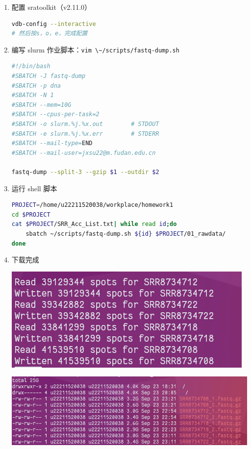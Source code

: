 \documentclass[
  a4paper,
]{article}
\newcommand{\passthrough}[1]{#1}
\begin{document}
\begin{enumerate}
\def\labelenumi{\arabic{enumi}.}
\item
  配置 sratoolkit（v2.11.0）

\begin{lstlisting}[language=bash]
vdb-config --interactive
# 然后按s，o，e，完成配置
\end{lstlisting}
\item
  编写 slurm
  作业脚本：\passthrough{\lstinline!vim \~/scripts/fastq-dump.sh!}

\begin{lstlisting}[language=bash]
#!/bin/bash
#SBATCH -J fastq-dump
#SBATCH -p dna
#SBATCH -N 1
#SBATCH --mem=10G
#SBATCH --cpus-per-task=2
#SBATCH -o slurm.%j.%x.out        # STDOUT
#SBATCH -e slurm.%j.%x.err        # STDERR
#SBATCH --mail-type=END
#SBATCH --mail-user=jxsu22@m.fudan.edu.cn

fastq-dump --split-3 --gzip $1 --outdir $2
\end{lstlisting}
\item
  运行 shell 脚本

\begin{lstlisting}[language=bash]
PROJECT=/home/u22211520038/workplace/homework1
cd $PROJECT
cat $PROJECT/SRR_Acc_List.txt| while read id;do
    sbatch ~/scripts/fastq-dump.sh ${id} $PROJECT/01_rawdata/ 
done
\end{lstlisting}
\item
  下载完成

  \includegraphics{assets/image-20220923232239-tkxtdyv.png}\hspace{0pt}

  \includegraphics{assets/image-20220926232618-otpzdnj.png}\hspace{0pt}

  \hspace{0pt}
\end{enumerate}
\end{document}

